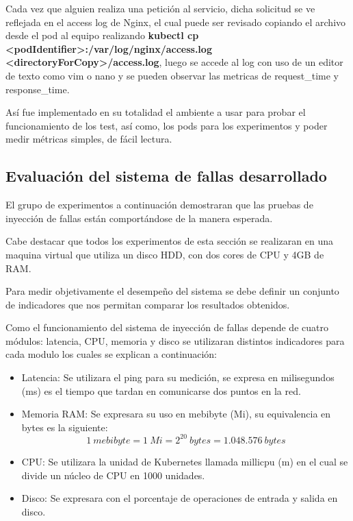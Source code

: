 \par Cada vez que alguien realiza una petición al servicio, dicha solicitud se ve reflejada en el access log de Nginx, el cual puede ser revisado copiando el archivo desde el pod al equipo realizando \textbf{kubectl cp <podIdentifier>:/var/log/nginx/access.log <directoryForCopy>/access.log}, luego se accede al log con uso de un editor de texto como vim o nano y se pueden observar las metricas de request\_time y response\_time.\\ 

\par Así fue implementado en su totalidad el ambiente a usar para probar el funcionamiento de los test, así como, los pods para los experimentos y poder medir métricas simples, de fácil lectura. 

\subsection{Evaluaci\'on del sistema de fallas desarrollado}

\par El grupo de experimentos a continuación demostraran que las pruebas de inyección de fallas están comportándose de la manera esperada.\\ 

\par Cabe destacar que todos los experimentos de esta sección se realizaran en una maquina virtual que utiliza un disco HDD, con dos cores de CPU y 4GB de RAM.\\

\par Para medir objetivamente el desempeño del sistema se debe definir un conjunto de indicadores que nos permitan comparar los resultados obtenidos.\\

\par Como el funcionamiento del sistema de inyección de fallas depende de cuatro módulos: latencia, CPU, memoria y disco se utilizaran distintos indicadores para cada modulo los cuales se explican a continuación:
\begin{itemize}
    \item Latencia: Se utilizara el ping para su medición, se expresa en milisegundos (ms) es el tiempo que tardan en comunicarse dos puntos en la red.
    \item Memoria RAM: Se expresara su uso en mebibyte (Mi), su equivalencia en bytes es la siguiente: \[ 1\ mebibyte = 1\ Mi = 2^{20}\ bytes = 1.048.576\ bytes \]
    \item CPU: Se utilizara la unidad de Kubernetes llamada millicpu (m) en el cual se divide un núcleo de CPU en 1000 unidades.
    \item Disco: Se expresara con el porcentaje de operaciones de entrada y salida en disco.
\end{itemize} 

